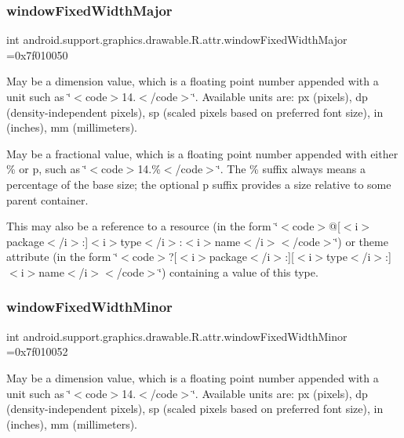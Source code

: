 \subsubsection{\texorpdfstring{window\+Fixed\+Width\+Major}{windowFixedWidthMajor}}
{\footnotesize\ttfamily int android.\+support.\+graphics.\+drawable.\+R.\+attr.\+window\+Fixed\+Width\+Major =0x7f010050\hspace{0.3cm}{\ttfamily [static]}}

May be a dimension value, which is a floating point number appended with a unit such as \char`\"{}$<$code$>$14.\+5sp$<$/code$>$\char`\"{}. Available units are\+: px (pixels), dp (density-\/independent pixels), sp (scaled pixels based on preferred font size), in (inches), mm (millimeters). 

May be a fractional value, which is a floating point number appended with either \% or p, such as \char`\"{}$<$code$>$14.\%$<$/code$>$\char`\"{}. The \% suffix always means a percentage of the base size; the optional p suffix provides a size relative to some parent container. 

This may also be a reference to a resource (in the form \char`\"{}$<$code$>$@\mbox{[}$<$i$>$package$<$/i$>$\+:\mbox{]}$<$i$>$type$<$/i$>$\+:$<$i$>$name$<$/i$>$$<$/code$>$\char`\"{}) or theme attribute (in the form \char`\"{}$<$code$>$?\mbox{[}$<$i$>$package$<$/i$>$\+:\mbox{]}\mbox{[}$<$i$>$type$<$/i$>$\+:\mbox{]}$<$i$>$name$<$/i$>$$<$/code$>$\char`\"{}) containing a value of this type. \mbox{\label{classandroid_1_1support_1_1graphics_1_1drawable_1_1R_1_1attr_acb889cc1fa6ccd797c484d34aca1aaf2}} 
\subsubsection{\texorpdfstring{window\+Fixed\+Width\+Minor}{windowFixedWidthMinor}}
{\footnotesize\ttfamily int android.\+support.\+graphics.\+drawable.\+R.\+attr.\+window\+Fixed\+Width\+Minor =0x7f010052\hspace{0.3cm}{\ttfamily [static]}}

May be a dimension value, which is a floating point number appended with a unit such as \char`\"{}$<$code$>$14.\+5sp$<$/code$>$\char`\"{}. Available units are\+: px (pixels), dp (density-\/independent pixels), sp (scaled pixels based on preferred font size), in (inches), mm (millimeters). 

